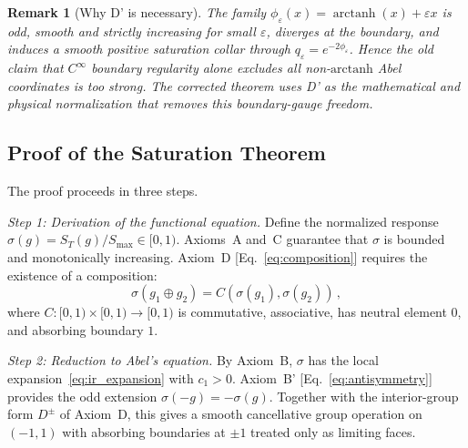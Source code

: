 \documentclass[aps,prd,twocolumn,superscriptaddress,nofootinbib]{revtex4-2}
\newtheorem{remark}{Remark}
\begin{document}
\begin{remark}[Why D' is necessary]
The family $\phi_\varepsilon(x)=\operatorname{arctanh}(x)+\varepsilon x$ is odd, smooth and strictly increasing for small $\varepsilon$, diverges at the boundary, and induces a smooth positive saturation collar through $q_\varepsilon=e^{-2\phi_\varepsilon}$. Hence the old claim that $C^\infty$ boundary regularity alone excludes all non-$\mathrm{arctanh}$ Abel coordinates is too strong. The corrected theorem uses D' as the mathematical and physical normalization that removes this boundary-gauge freedom.
\end{remark}

\subsection{Proof of the Saturation Theorem}

The proof proceeds in three steps.

\textit{Step 1: Derivation of the functional equation.}
Define the normalized response $\sigma(g) = S_T(g)/S_{\max} \in [0, 1)$. Axioms~A and~C guarantee that $\sigma$ is bounded and monotonically increasing. Axiom~D [Eq.~\eqref{eq:composition}] requires the existence of a composition:
\begin{equation}
\sigma(g_1 \oplus g_2) = C(\sigma(g_1), \sigma(g_2))\,,
\label{eq:normalized_composition}
\end{equation}
where $C: [0,1) \times [0,1) \to [0,1)$ is commutative, associative, has neutral element $0$, and absorbing boundary $1$.

\textit{Step 2: Reduction to Abel's equation.}
By Axiom~B, $\sigma$ has the local expansion~\eqref{eq:ir_expansion} with $c_1 > 0$. Axiom~B' [Eq.~\eqref{eq:antisymmetry}] provides the odd extension $\sigma(-g)=-\sigma(g)$. Together with the interior-group form $D^\pm$ of Axiom~D, this gives a smooth cancellative group operation on $(-1,1)$ with absorbing boundaries at $\pm 1$ treated only as limiting faces.
\end{document}
